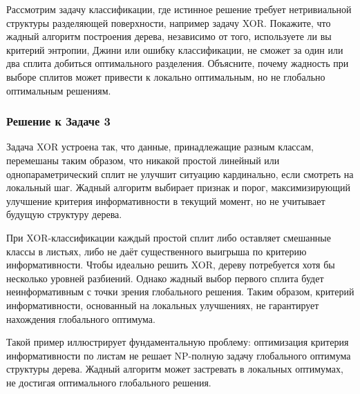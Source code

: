 Рассмотрим задачу классификации, где истинное решение требует нетривиальной структуры разделяющей поверхности, например задачу XOR. Покажите, что жадный алгоритм построения дерева, независимо от того, используете ли вы критерий энтропии, Джини или ошибку классификации, не сможет за один или два сплита добиться оптимального разделения. Объясните, почему жадность при выборе сплитов может привести к локально оптимальным, но не глобально оптимальным решениям.

\subsubsection*{Решение к Задаче 3}

Задача XOR устроена так, что данные, принадлежащие разным классам, перемешаны таким образом, что никакой простой линейный или однопараметрический сплит не улучшит ситуацию кардинально, если смотреть на локальный шаг. Жадный алгоритм выбирает признак и порог, максимизирующий улучшение критерия информативности в текущий момент, но не учитывает будущую структуру дерева.

При XOR-классификации каждый простой сплит либо оставляет смешанные классы в листьях, либо не даёт существенного выигрыша по критерию информативности. Чтобы идеально решить XOR, дереву потребуется хотя бы несколько уровней разбиений. Однако жадный выбор первого сплита будет неинформативным с точки зрения глобального решения. Таким образом, критерий информативности, основанный на локальных улучшениях, не гарантирует нахождения глобального оптимума.

Такой пример иллюстрирует фундаментальную проблему: оптимизация критерия информативности по листам не решает NP-полную задачу глобального оптимума структуры дерева. Жадный алгоритм может застревать в локальных оптимумах, не достигая оптимального глобального решения.
